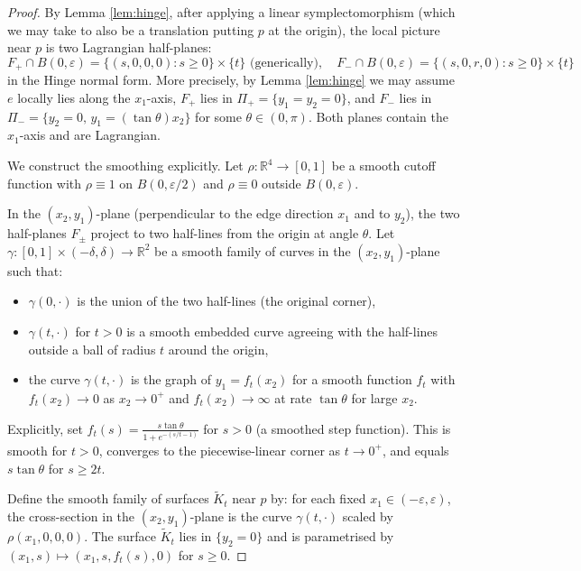 \documentclass[12pt]{article}
\theoremstyle{definition}
\begin{document}
\begin{proof}
By Lemma \ref{lem:hinge}, after applying a linear symplectomorphism (which we may take to also be a translation putting $p$ at the origin), the local picture near $p$ is two Lagrangian half-planes:
\begin{equation}
\label{eq:hinge_local}
  F_+ \cap B(0,\varepsilon) = \{(s, 0, 0, 0) : s \geq 0\} \times \{t\} \text{ (generically)},\quad
  F_- \cap B(0,\varepsilon) = \{(s, 0, r, 0) : s \geq 0\} \times \{t\}
\end{equation}
in the Hinge normal form. More precisely, by Lemma \ref{lem:hinge} we may assume $e$ locally lies along the $x_1$-axis, $F_+$ lies in $\Pi_+ = \{y_1 = y_2 = 0\}$, and $F_-$ lies in $\Pi_- = \{y_2 = 0,\, y_1 = (\tan\theta) x_2\}$ for some $\theta \in (0,\pi)$. Both planes contain the $x_1$-axis and are Lagrangian.

We construct the smoothing explicitly. Let $\rho \colon \mathbb{R}^4 \to [0,1]$ be a smooth cutoff function with $\rho \equiv 1$ on $B(0,\varepsilon/2)$ and $\rho \equiv 0$ outside $B(0,\varepsilon)$.

In the $(x_2, y_1)$-plane (perpendicular to the edge direction $x_1$ and to $y_2$), the two half-planes $F_\pm$ project to two half-lines from the origin at angle $\theta$. Let $\gamma \colon [0,1] \times (-\delta, \delta) \to \mathbb{R}^2$ be a smooth family of curves in the $(x_2, y_1)$-plane such that:
\begin{itemize}
  \item $\gamma(0, \cdot)$ is the union of the two half-lines (the original corner),
  \item $\gamma(t, \cdot)$ for $t > 0$ is a smooth embedded curve agreeing with the half-lines outside a ball of radius $t$ around the origin,
  \item the curve $\gamma(t, \cdot)$ is the graph of $y_1 = f_t(x_2)$ for a smooth function $f_t$ with $f_t(x_2) \to 0$ as $x_2 \to 0^+$ and $f_t(x_2) \to \infty$ at rate $\tan\theta$ for large $x_2$.
\end{itemize}
Explicitly, set $f_t(s) = \frac{s \tan\theta}{1 + e^{-(s/t - 1)}}$ for $s > 0$ (a smoothed step function). This is smooth for $t > 0$, converges to the piecewise-linear corner as $t \to 0^+$, and equals $s\tan\theta$ for $s \geq 2t$.

Define the smooth family of surfaces $\tilde{K}_t$ near $p$ by: for each fixed $x_1 \in (-\varepsilon, \varepsilon)$, the cross-section in the $(x_2, y_1)$-plane is the curve $\gamma(t, \cdot)$ scaled by $\rho(x_1,0,0,0)$. The surface $\tilde{K}_t$ lies in $\{y_2 = 0\}$ and is parametrised by $(x_1, s) \mapsto (x_1, s, f_t(s), 0)$ for $s \geq 0$.


\end{proof}
\end{document}
